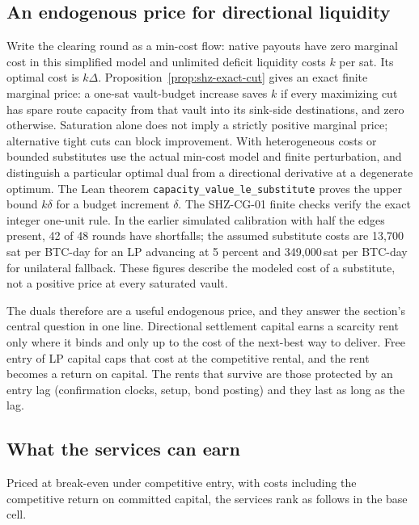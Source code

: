 \subsection{An endogenous price for directional liquidity}
\label{sec:rent-dual}

Write the clearing round as a min-cost flow: native payouts have zero marginal cost in this simplified model and unlimited deficit liquidity costs $k$ per sat. Its optimal cost is $k\Delta$. Proposition~\ref{prop:shz-exact-cut} gives an exact finite marginal price: a one-sat vault-budget increase saves $k$ if every maximizing cut has spare route capacity from that vault into its sink-side destinations, and zero otherwise. Saturation alone does not imply a strictly positive marginal price; alternative tight cuts can block improvement. With heterogeneous costs or bounded substitutes use the actual min-cost model and finite perturbation, and distinguish a particular optimal dual from a directional derivative at a degenerate optimum. The Lean theorem \texttt{capacity\_\allowbreak{}value\_\allowbreak{}le\_\allowbreak{}substitute} proves the upper bound $k\delta$ for a budget increment $\delta$. The SHZ-CG-01 finite checks verify the exact integer one-unit rule. In the earlier simulated calibration with half the edges present, 42 of 48 rounds have shortfalls; the assumed substitute costs are 13{,}700\,sat per BTC-day for an LP advancing at 5 percent and 349{,}000\,sat per BTC-day for unilateral fallback. These figures describe the modeled cost of a substitute, not a positive price at every saturated vault.

The duals therefore are a useful endogenous price, and they answer the section's central question in one line. Directional settlement capital earns a scarcity rent only where it binds and only up to the cost of the next-best way to deliver. Free entry of LP capital caps that cost at the competitive rental, and the rent becomes a return on capital. The rents that survive are those protected by an entry lag (confirmation clocks, setup, bond posting) and they last as long as the lag.

\subsection{What the services can earn}
\label{sec:rent-services}

Priced at break-even under competitive entry, with costs including the competitive return on committed capital, the services rank as follows in the base cell.

